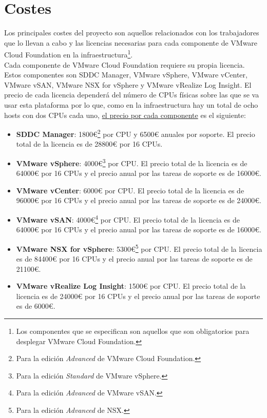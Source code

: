 \section{Costes}
Los principales costes del proyecto son aquellos relacionados con los trabajadores que lo llevan a cabo y las licencias necesarias para cada componente de VMware Cloud Foundation en la infraestructura\footnote{Los componentes que se especifican son aquellos que son obligatorios para desplegar VMware Cloud Foundation.}.\\
Cada componente de VMware Cloud Foundation requiere su propia licencia\cite{licenses}. Estos componentes son SDDC Manager, VMware vSphere, VMware vCenter, VMware vSAN, VMware NSX for vSphere y VMware vRealize Log Insight. El precio de cada licencia dependerá del número de CPUs físicas sobre las que se va usar esta plataforma por lo que, como en la infraestructura hay un total de ocho hosts con dos CPUs cada uno, \underline{el precio por cada componente} es el siguiente:
\begin{itemize}
    \item \textbf{SDDC Manager}: 1800€\footnote{Para la edición \textit{Advanced} de VMware Cloud Foundation.} por CPU y 6500€ anuales por soporte. El precio total de la licencia es de 28800€ por 16 CPUs.
    \item \textbf{VMware vSphere}: 4000€\footnote{Para la edición \textit{Standard} de VMware vSphere.} por CPU. El precio total de la licencia es de 64000€ por 16 CPUs y el precio anual por las tareas de soporte es de 16000€.
    \item \textbf{VMware vCenter}: 6000€ por CPU. El precio total de la licencia es de 96000€ por 16 CPUs y el precio anual por las tareas de soporte es de 24000€.
    \item \textbf{VMware vSAN}: 4000€\footnote{Para la edición \textit{Advanced} de VMware vSAN.} por CPU. El precio total de la licencia es de 64000€ por 16 CPUs y el precio anual por las tareas de soporte es de 16000€.
    \item \textbf{VMware NSX for vSphere}: 5300€\footnote{Para la edición \textit{Advanced} de NSX.} por CPU. El precio total de la licencia es de 84400€ por 16 CPUs y el precio anual por las tareas de soporte es de 21100€.
    \item \textbf{VMware vRealize Log Insight}: 1500€ por CPU. El precio total de la licencia es de 24000€ por 16 CPUs y el precio anual por las tareas de soporte es de 6000€.
\end{itemize}

